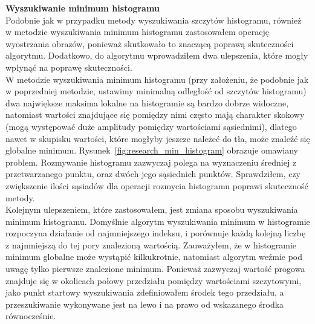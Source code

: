 \textbf{Wyszukiwanie minimum histogramu}\\
Podobnie jak w przypadku metody wyszukiwania szczytów histogramu, również w metodzie wyszukiwania minimum histogramu zastosowałem operację wyostrzania obrazów, ponieważ skutkowało to znaczącą poprawą skuteczności algorytmu. Dodatkowo, do algorytmu wprowadziłem dwa ulepszenia, które mogły wpłynąć na poprawę skuteczności.\\
W metodzie wyszukiwania minimum histogramu (przy założeniu, że podobnie jak w poprzedniej metodzie, ustawimy minimalną odległość od szczytów histogramu) dwa największe maksima lokalne na histogramie są bardzo dobrze widoczne, natomiast wartości znajdujące się pomiędzy nimi często mają charakter skokowy (mogą występować duże amplitudy pomiędzy wartościami sąsiednimi), dlatego nawet w skupisku wartości, które mogłyby jeszcze należeć do tła, może znaleźć się globalne minimum. Rysunek~\ref{fig:research_min_histogram} obrazuje omawiany problem. Rozmywanie histogramu zazwyczaj polega na wyznaczeniu średniej z przetwarzanego punktu, oraz dwóch jego sąsiednich punktów. Sprawdziłem, czy zwiększenie ilości sąsiadów dla operacji rozmycia histogramu poprawi skuteczność metody.\\
Kolejnym ulepszeniem, które zastosowałem, jest zmiana sposobu wyszukiwania minimum histogramu. Domyślnie algorytm wyszukiwania minimum w histogramie rozpoczyna działanie od najmniejszego indeksu, i porównuje każdą kolejną liczbę z najmniejszą do tej pory znalezioną wartością. Zauważyłem, że w histogramie minimum globalne może wystąpić kilkukrotnie, natomiast algorytm weźmie pod uwagę tylko pierwsze znalezione minimum. Ponieważ zazwyczaj wartość progowa znajduje się w okolicach połowy przedziału pomiędzy wartościami szczytowymi, jako punkt startowy wyszukiwania zdefiniowałem środek tego przedziału, a przeszukiwanie wykonywane jest na lewo i na prawo od wskazanego środka równocześnie.\\

